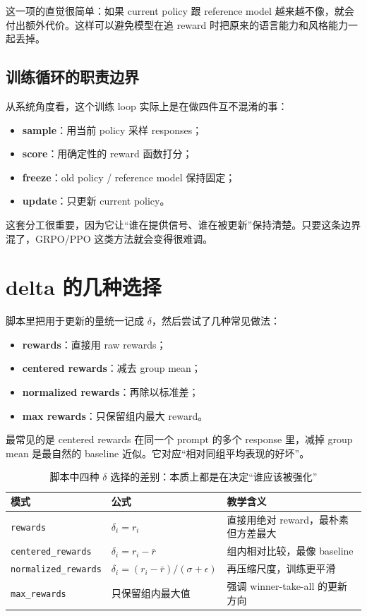 \documentclass[a4paper]{article}
\begin{document}
这一项的直觉很简单：如果 current policy 跟 reference model 越来越不像，就会付出额外代价。这样可以避免模型在追 reward 时把原来的语言能力和风格能力一起丢掉。


\subsection{训练循环的职责边界}

从系统角度看，这个训练 loop 实际上是在做四件互不混淆的事：
\begin{itemize}
    \item \textbf{sample}：用当前 policy 采样 responses；
    \item \textbf{score}：用确定性的 reward 函数打分；
    \item \textbf{freeze}：old policy / reference model 保持固定；
    \item \textbf{update}：只更新 current policy。
\end{itemize}

这套分工很重要，因为它让“谁在提供信号、谁在被更新”保持清楚。只要这条边界混了，GRPO/PPO 这类方法就会变得很难调。

\section{delta 的几种选择}

脚本里把用于更新的量统一记成 $\delta$，然后尝试了几种常见做法：

\begin{itemize}
    \item \textbf{rewards}：直接用 raw rewards；
    \item \textbf{centered rewards}：减去 group mean；
    \item \textbf{normalized rewards}：再除以标准差；
    \item \textbf{max rewards}：只保留组内最大 reward。
\end{itemize}

\begin{knowledgebox}{最常见的是 centered rewards}
在同一个 prompt 的多个 response 里，减掉 group mean 是最自然的 baseline 近似。它对应“相对同组平均表现的好坏”。
\end{knowledgebox}

\begin{table}[H]
\centering
\begin{tabular}{@{}lll@{}}
\toprule
\textbf{模式} & \textbf{公式} & \textbf{教学含义} \\
\midrule
\texttt{rewards} & $\delta_i = r_i$ & 直接用绝对 reward，最朴素但方差最大 \\
\texttt{centered\_rewards} & $\delta_i = r_i - \bar r$ & 组内相对比较，最像 baseline \\
\texttt{normalized\_rewards} & $\delta_i = (r_i - \bar r)/(\sigma + \epsilon)$ & 再压缩尺度，训练更平滑 \\
\texttt{max\_rewards} & 只保留组内最大值 & 强调 winner-take-all 的更新方向 \\
\bottomrule
\end{tabular}
\caption{脚本中四种 $\delta$ 选择的差别：本质上都是在决定“谁应该被强化”}
\end{table}
\end{document}
